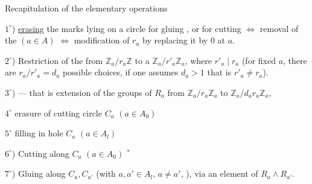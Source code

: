Recapitulation of the elementary operations


$1^\circ$) \uline{erasing}  the marks lying on a circle  for gluing , or  for cutting
$\Longleftrightarrow$ removal of the  
$(a\in A)$ $\Longleftrightarrow$ modification of $r_a$ by
replacing it by $0$ at $a$.

$2^\circ$) 
Restriction of the   from $\mathbb Z_a/r_a\mathbb Z$ to a
$\mathbb Z_a/r'_a\mathbb Z_a$, where $r'_a\mid r_a$
(for fixed $a$, there are $r_a/r'_a=d_a$ possible choices, if one assumes $d_a>1$ that is $r'_a\ne r_a$).

$3^\circ$) 
--- that is extension of the groups of $R_a$ from
$\mathbb Z_a/r_a\mathbb Z_a$ to $\mathbb Z_a/d_ar_a\mathbb Z_a$,

\textcircled{$4^\circ$} erasure of cutting circle $C_a$ $(a\in A_0)$

\textcircled{$5^\circ$} filling in hole $C_a$ $(a\in A_l)$

$6^\circ$) Cutting along $C_a$ $(a\in A_0)$ \({}^*\)

$7^\circ$) Gluing along $C_a,C_{a'}$
(with $a,a'\in A_l$, $a\ne a'$, ), via an element of
$R_a\mathbin{\wedge}R_{a'}$.

